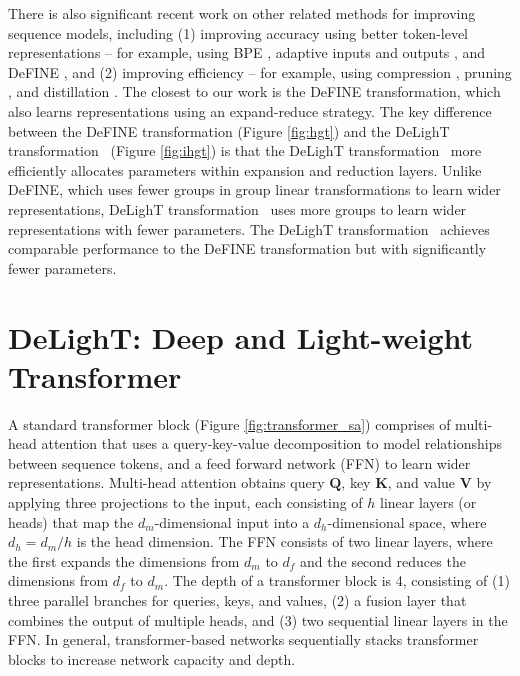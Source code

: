  There is also significant recent work on other related methods for improving sequence models, including (1) improving accuracy using better token-level representations -- for example, using BPE \citep{sennrich2015neural}, adaptive inputs \citep{baevski2018adaptive} and outputs \citep{grave2017efficient}, and DeFINE \citep{mehta2020DeFINE}, and (2) improving efficiency -- for example, using compression \citep{chen2018groupreduce,sun2020mobilebert}, pruning \citep{han2015deep,voita2019analyzing}, and distillation \citep{hinton2015distilling,sanh2019distilbert}. The closest to our work is the DeFINE transformation, which also learns representations using an expand-reduce strategy. The key difference between the DeFINE transformation (Figure \ref{fig:hgt}) and the DeLighT transformation ~(Figure \ref{fig:ihgt}) is that the DeLighT transformation ~more efficiently allocates parameters within expansion and reduction layers. Unlike DeFINE, which uses fewer groups in group linear transformations to learn wider representations, DeLighT transformation ~uses more groups to learn wider representations with fewer parameters. The DeLighT transformation ~achieves comparable performance to the DeFINE transformation but with significantly fewer parameters.

\section{DeLighT: Deep and Light-weight Transformer}
\label{sec:arcitecture}

A standard transformer block (Figure \ref{fig:transformer_sa}) comprises of multi-head attention that uses a query-key-value decomposition to model relationships between sequence tokens, and a feed forward network (FFN) to learn wider representations. Multi-head attention obtains query $\mathbf{Q}$, key $\mathbf{K}$, and value $\mathbf{V}$ by applying three projections to the input, each consisting of $h$ linear layers (or heads) that map the $d_m$-dimensional input into a $d_h$-dimensional space, where $d_h=d_m/h$ is the head dimension. The FFN consists of two linear layers, where the first expands the dimensions from $d_m$ to $d_f$ and the second reduces the dimensions from $d_f$ to $d_m$. The depth of a transformer block is 4, consisting of (1) three parallel branches for queries, keys, and values, (2) a fusion layer that combines the output of multiple heads, and (3) two sequential linear layers in the FFN. In general, transformer-based networks sequentially stacks transformer blocks to increase network capacity and depth.

